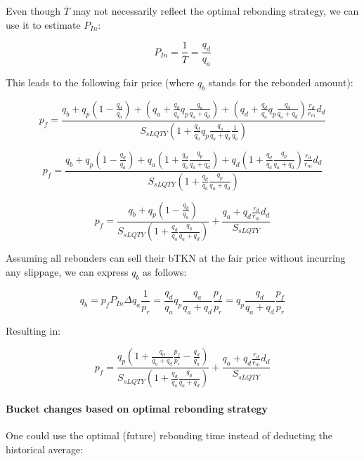 \documentclass{article}
\begin{document}
Even though $\overline{T}$ may not necessarily reflect the optimal rebonding strategy, we can use it to estimate $P_{In}$:

\begin{equation}
   P_{In} = \frac{1}{\overline{T}} = \frac{q_{d}}{q_{a}}
\end{equation}

This leads to the following fair price (where $q_b$ stands for the rebonded amount):

\[
p_{f} = \frac{q_{b}+q_{p} \left(1-\frac{q_{d}}{q_{a}}\right)+\left(q_{a}+\frac{q_{d}}{q_{a}}q_{p}\frac{q_{a}}{q_{a}+q_{d}}\right)+ \left(q_{d}+\frac{q_{d}}{q_{a}}q_{p}\frac{q_{d}}{q_{a}+q_{d}}\right)\frac{r_{d}}{r_{m}}d_{d}}{S_{sLQTY} \left( 1+\frac{q_{d}}{q_{a}} q_{p}\frac{q_{a}}{q_{a}+q_{d}}\frac{1}{q_{a}} \right)}
\]

\[
p_{f} = \frac{q_{b}+q_{p} \left(1-\frac{q_{d}}{q_{a}}\right)+q_{a}\left(1+\frac{q_{d}}{q_{a}}\frac{q_{p}}{q_{a}+q_{d}}\right)+q_{d} \left(1+\frac{q_{d}}{q_{a}}\frac{q_{p}}{q_{a}+q_{d}}\right)\frac{r_{d}}{r_{m}}d_{d}}{S_{sLQTY} \left( 1+\frac{q_{d}}{q_{a}}\frac{q_{p}}{q_{a}+q_{d}} \right)}
\]

\begin{equation}
p_{f} = \frac{q_{b}+q_{p} \left(1-\frac{q_{d}}{q_{a}}\right)}{S_{sLQTY} \left( 1+\frac{q_{d}}{q_{a}}\frac{q_{p}}{q_{a}+q_{d}} \right)} + \frac{q_{a}+q_{d}\frac{r_{d}}{r_{m}}d_{d}}{S_{sLQTY}}
\end{equation}

Assuming all rebonders can sell their bTKN at the fair price without incurring any slippage, we can express $q_b$ as follows:

\begin{equation}
q_{b} = p_f P_{In} \Delta q_{a} \frac{1}{p_r} = \frac{q_{d}}{q_{a}} q_p \frac{q_{a}}{q_{a}+q_{d}} \frac{p_{f}}{p_{r}}  = q_p \frac{q_{d}}{q_{a}+q_{d}} \frac{p_{f}}{p_{r}}
\end{equation}

Resulting in:

\begin{equation}
p_{f} = \frac{q_{p} \left(1+\frac{q_{d}}{q_{a}+q_{d}} \frac{p_{f}}{p_{r}}-\frac{q_{d}}{q_{a}}\right)}{S_{sLQTY} \left( 1+\frac{q_{d}}{q_{a}}\frac{q_{p}}{q_{a}+q_{d}} \right)} + \frac{q_{a}+q_{d}\frac{r_{d}}{r_{m}}d_{d}}{S_{sLQTY}}
\end{equation}

\paragraph{Bucket changes based on optimal rebonding strategy}
One could use the optimal (future) rebonding time instead of deducting the historical average:
\end{document}
